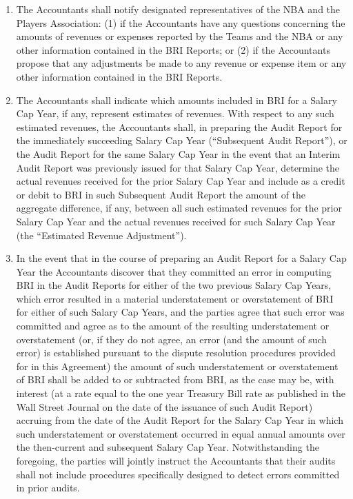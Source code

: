 \documentclass[
]{book}
\begin{document}
\begin{enumerate}
\item
  The Accountants shall notify designated representatives of the NBA and the Players Association: (1) if the Accountants have any questions concerning the amounts of revenues or expenses reported by the Teams and the NBA or any other information contained in the BRI Reports; or (2) if the Accountants propose that any adjustments be made to any revenue or expense item or any other information contained in the BRI Reports.
\item
  The Accountants shall indicate which amounts included in BRI for a Salary Cap Year, if any, represent estimates of revenues. With respect to any such estimated revenues, the Accountants shall, in preparing the Audit Report for the immediately succeeding Salary Cap Year (``Subsequent Audit Report''), or the Audit Report for the same Salary Cap Year in the event that an Interim Audit Report was previously issued for that Salary Cap Year, determine the actual revenues received for the prior Salary Cap Year and include as a credit or debit to BRI in such Subsequent Audit Report the amount of the aggregate difference, if any, between all such estimated revenues for the prior Salary Cap Year and the actual revenues received for such Salary Cap Year (the ``Estimated Revenue Adjustment'').
\item
  In the event that in the course of preparing an Audit Report for a Salary Cap Year the Accountants discover that they committed an error in computing BRI in the Audit Reports for either of the two previous Salary Cap Years, which error resulted in a material understatement or overstatement of BRI for either of such Salary Cap Years, and the parties agree that such error was committed and agree as to the amount of the resulting understatement or overstatement (or, if they do not agree, an error (and the amount of such error) is established pursuant to the dispute resolution procedures provided for in this Agreement) the amount of such understatement or overstatement of BRI shall be added to or subtracted from BRI, as the case may be, with interest (at a rate equal to the one year Treasury Bill rate as published in the Wall Street Journal on the date of the issuance of such Audit Report) accruing from the date of the Audit Report for the Salary Cap Year in which such understatement or overstatement occurred in equal annual amounts over the then-current and subsequent Salary Cap Year. Notwithstanding the foregoing, the parties will jointly instruct the Accountants that their audits shall not include procedures specifically designed to detect errors committed in prior audits.

\end{enumerate}
\end{document}
